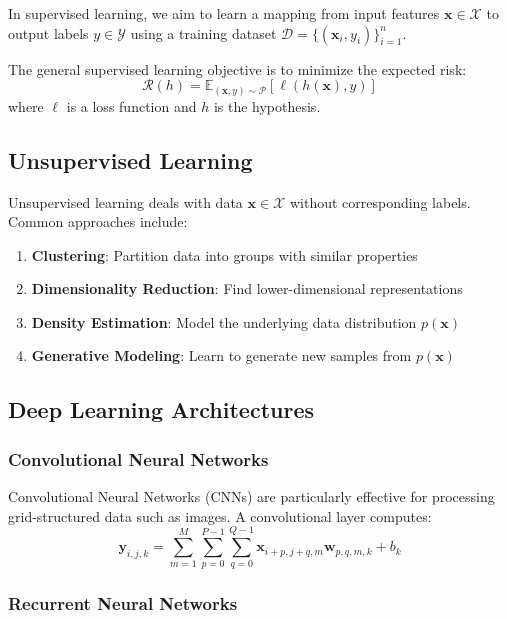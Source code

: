 \documentclass{article}
\begin{document}
In supervised learning, we aim to learn a mapping from input features
$\mathbf{x} \in \mathcal{X}$ to output labels $y \in \mathcal{Y}$ using
a training dataset $\mathcal{D} = \{(\mathbf{x}_i, y_i)\}_{i=1}^n$.

The general supervised learning objective is to minimize the expected
risk:
\[
\mathcal{R}(h) = \mathbb{E}_{(\mathbf{x},y) \sim \mathcal{P}}[\ell(h(\mathbf{x}), y)]
\]
where $\ell$ is a loss function and $h$ is the hypothesis.

\subsection{Unsupervised Learning}

Unsupervised learning deals with data $\mathbf{x} \in \mathcal{X}$ without
corresponding labels. Common approaches include:

\begin{enumerate}
\item \textbf{Clustering}: Partition data into groups with similar properties
\item \textbf{Dimensionality Reduction}: Find lower-dimensional representations
\item \textbf{Density Estimation}: Model the underlying data distribution $p(\mathbf{x})$
\item \textbf{Generative Modeling}: Learn to generate new samples from $p(\mathbf{x})$
\end{enumerate}

\subsection{Deep Learning Architectures}

\subsubsection{Convolutional Neural Networks}

Convolutional Neural Networks (CNNs) are particularly effective for
processing grid-structured data such as images. A convolutional layer
computes:
\[
\mathbf{y}_{i,j,k} = \sum_{m=1}^M \sum_{p=0}^{P-1} \sum_{q=0}^{Q-1}
\mathbf{x}_{i+p,j+q,m} \mathbf{w}_{p,q,m,k} + b_k
\]

\subsubsection{Recurrent Neural Networks}
\end{document}
